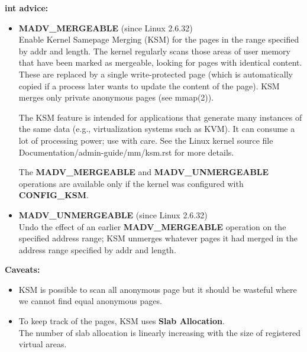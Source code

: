 \textbf{int advice:}
\begin{itemize}
\item \textbf{MADV\_MERGEABLE} (since Linux 2.6.32) \\
  Enable Kernel Samepage Merging (KSM) for the pages in the
  range specified by addr and length.  The kernel regularly
  scans those areas of user memory that have been marked as
  mergeable, looking for pages with identical content.  These
  are replaced by a single write-protected page (which is
  automatically copied if a process later wants to update the
  content of the page).  KSM merges only private anonymous pages
  (see mmap(2)).
  
  The KSM feature is intended for applications that generate
  many instances of the same data (e.g., virtualization systems
  such as KVM).  It can consume a lot of processing power; use
  with care.  See the Linux kernel source file
  Documentation/admin-guide/mm/ksm.rst for more details.

  The \textbf{MADV\_MERGEABLE} and \textbf{MADV\_UNMERGEABLE} operations are
  available only if the kernel was configured with \textbf{CONFIG\_KSM}.

\item \textbf{MADV\_UNMERGEABLE} (since Linux 2.6.32) \\
  Undo the effect of an earlier \textbf{MADV\_MERGEABLE} operation on the
  specified address range; KSM unmerges whatever pages it had
  merged in the address range specified by addr and length.
\end{itemize}

\vspace{5mm}

\textbf{Caveats:}
\begin{itemize}
\item KSM is possible to scan all anonymous page but it should be wasteful where we cannot find equal anonymous pages.

\item To keep track of the pages, KSM uses \textbf{Slab Allocation}. \\ The number of slab allocation is linearly increasing with the size of registered virtual areas.
\end{itemize}

\vspace{5mm}

